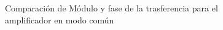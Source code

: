 \begin{figure}[H]
    \centering
{}
\caption{Comparaci\'on de M\'odulo y fase de la trasferencia para el amplificador en modo com\'un}
\label{fig:Comp_common_R5}
\end{figure}

